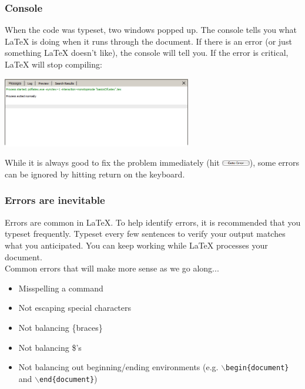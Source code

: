 \documentclass[slidestop,compress,mathserif]{beamer}
\begin{document}
\begin{frame} \frametitle{Console}
When the code was typeset, two windows popped up. The {\color{highlight}console} tells you what LaTeX is doing when it runs through the document. If there is an error (or just something LaTeX doesn't like), the console will tell you. If the error is critical, LaTeX will stop compiling:
	\begin{center}
		\includegraphics[height=1.2in]{basicsOfLatex/gettingStarted/texstudioConsole}
	\end{center}
While it is always good to fix the problem immediately (hit \includegraphics[height=0.25cm]{basicsOfLatex/gettingStarted/gotoError}), some errors can be ignored by hitting {\color{highlight}return} on the keyboard.
\end{frame}

\begin{frame} \frametitle{Errors are inevitable}
Errors are common in LaTeX. To help identify errors, it is recommended that you typeset frequently. Typeset every few sentences to verify your output matches what you anticipated. You can keep working while LaTeX processes your document. \\
\vspace{0.7cm}
Common errors that will make more sense as we go along...
\begin{itemize}
\item Misspelling a command
\item Not escaping special characters
\item Not balancing {\color{braces}\{}braces{\color{braces}\}}
\item Not balancing {\color{braces}\$}'s
\item Not balancing out beginning/ending environments (e.g. \texttt{\color{command}$\backslash$begin\color{braces}\{\color{black}document\color{braces}\}} and \texttt{\color{command}$\backslash$end\color{braces}\{\color{black}document\color{braces}\}})
\end{itemize}
\end{frame}
\end{document}
